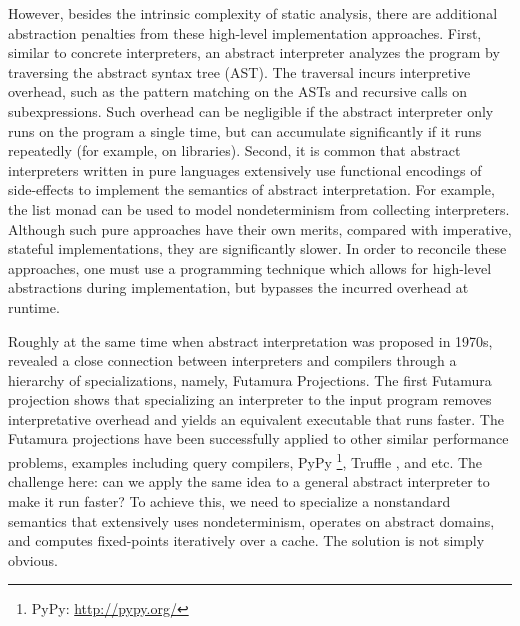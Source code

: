 However, besides the intrinsic complexity of static analysis, there are
additional abstraction penalties from these high-level implementation
approaches. First, similar to concrete interpreters, an abstract interpreter
analyzes the program by traversing the abstract syntax tree (AST). The traversal incurs
interpretive overhead, such as the pattern matching on the ASTs and recursive
calls on subexpressions. Such overhead can be negligible if the abstract
interpreter only runs on the program a single time, but can accumulate
significantly if it runs repeatedly (for example, on libraries).  Second, it is
common that abstract interpreters written in pure languages extensively use
functional encodings of side-effects to implement the semantics of abstract interpretation.
For example, the list monad can be used to model nondeterminism from collecting
interpreters.
Although such pure approaches have their own merits, compared with imperative,
stateful implementations, they are significantly slower.  In order to
reconcile these approaches, one must use a programming technique which allows
for high-level abstractions during implementation, but bypasses the
incurred overhead at runtime.

Roughly at the same time when abstract interpretation was proposed in
1970s, \citet{futamura1971partial} revealed a close
connection between interpreters and compilers through a hierarchy of
specializations, namely, Futamura Projections. The first Futamura
projection shows that specializing an interpreter to the input program
removes interpretative overhead and yields an equivalent executable
that runs faster. The Futamura projections have been successfully applied to
other similar performance problems, examples including
query compilers\cite{DBLP:conf/sigmod/TahboubER18}, PyPy \footnote{PyPy:
\url{http://pypy.org/}}, Truffle \cite{Marr:2015:TVP:2814270.2814275}, and etc.
The challenge here: can we apply the same idea to a general abstract interpreter
to make it run faster? To achieve this, we need to specialize a nonstandard
semantics that extensively uses nondeterminism, operates on abstract domains,
and computes fixed-points iteratively over a cache. The solution is not simply obvious.

